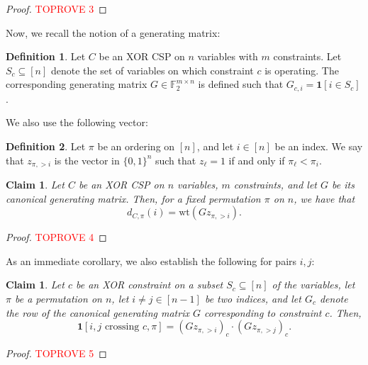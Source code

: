 \documentclass[11pt]{article}
\newtheorem{claim}[theorem]{Claim}
\theoremstyle{definition}
\newtheorem{definition}{Definition}[section]
\newcommand{\F}{\mathbb{F}}
\newcommand{\zo}{\{0, 1\}}
\newcommand{\wt}{\mathrm{wt}}
\begin{document}
\begin{proof}\textcolor{red}{TOPROVE 3}\end{proof}

Now, we recall the notion of a generating matrix:

\begin{definition}\label{def:genMatrixXOR}
    Let $C$ be an XOR CSP on $n$ variables with $m$ constraints. Let $S_c \subseteq [n]$ denote the set of variables on which constraint $c$ is operating. The corresponding generating matrix $G \in \F_2^{m \times n}$ is defined such that $G_{c, i} = \mathbf{1}[i \in S_c]$.
\end{definition}

We also use the following vector:

\begin{definition}
	Let $\pi$ be an ordering on $[n]$, and let $i \in [n]$ be an index. We say that $z_{\pi, > i}$ is the vector in $\zo^n$ such that $z_{\ell} = 1$ if and only if $\pi_{\ell} < \pi_i$.
\end{definition}

\begin{claim}\label{clm:crossingEquivalence}
	Let $C$ be an XOR CSP on $n$ variables, $m$ constraints, and let $G$ be its canonical generating matrix. Then, for a fixed permutation $\pi$ on $n$, we have that 
	\[
	d_{C, \pi}(i) = \wt(G z_{\pi, > i}).
	\]
\end{claim}

\begin{proof}\textcolor{red}{TOPROVE 4}\end{proof}

As an immediate corollary, we also establish the following for pairs $i,j$:

\begin{claim}\label{clm:crossingProduct}
	Let $c$ be an XOR constraint on a subset $S_c \subseteq [n]$ of the variables, let $\pi$ be a permutation on $n$, let $i \neq j \in [n-1]$ be two indices, and let $G_c$ denote the row of the canonical generating matrix $G$ corresponding to constraint $c$. Then, 
	\[
	\mathbf{1}[i,j \text{ crossing } c, \pi] = (G z_{\pi, > i})_c \cdot (G z_{\pi, > j})_c.
	\]
\end{claim}

\begin{proof}\textcolor{red}{TOPROVE 5}\end{proof}
\end{document}
